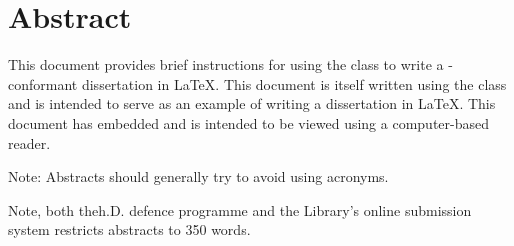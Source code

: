 
\chapter{Abstract}

This document provides brief instructions for using the 
class to write a -conformant dissertation in \LaTeX.  This
document is itself written using the  class and is
intended to serve as an example of writing a dissertation in \LaTeX.
This document has embedded and is intended to be viewed
using a computer-based reader.

Note: Abstracts should generally try to avoid using acronyms.

Note, both theh.D. defence programme and the
Library's online submission system restricts abstracts to 350
words.

